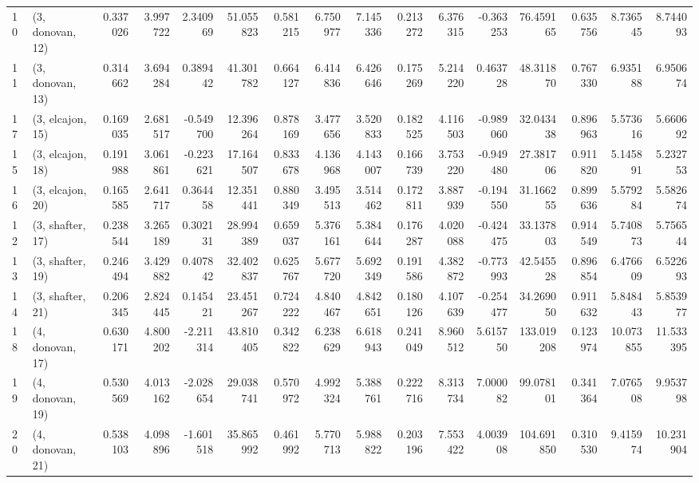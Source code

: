 \begin{tabular}{llrrrrrrrrrrrrrr}
10 &  (3, donovan, 12) &   0.337026 &  3.997722 &  2.340969 &  51.055823 &  0.581215 &   6.750977 &  7.145336 &  0.213272 &   6.376315 & -0.363253 &   76.459165 &  0.635756 &   8.736545 &   8.744093 \\
11 &  (3, donovan, 13) &   0.314662 &  3.694284 &  0.389442 &  41.301782 &  0.664127 &   6.414836 &  6.426646 &  0.175269 &   5.214220 &  0.463728 &   48.311870 &  0.767330 &   6.935188 &   6.950674 \\
17 &  (3, elcajon, 15) &   0.169035 &  2.681517 & -0.549700 &  12.396264 &  0.878169 &   3.477656 &  3.520833 &  0.182525 &   4.116503 & -0.989060 &   32.043438 &  0.896963 &   5.573616 &   5.660692 \\
15 &  (3, elcajon, 18) &   0.191988 &  3.061861 & -0.223621 &  17.164507 &  0.833678 &   4.136968 &  4.143007 &  0.166739 &   3.753220 & -0.949480 &   27.381706 &  0.911820 &   5.145891 &   5.232753 \\
16 &  (3, elcajon, 20) &   0.165585 &  2.641717 &  0.364458 &  12.351441 &  0.880349 &   3.495513 &  3.514462 &  0.172811 &   3.887939 & -0.194550 &   31.166255 &  0.899636 &   5.579284 &   5.582674 \\
12 &  (3, shafter, 17) &   0.238544 &  3.265189 &  0.302131 &  28.994389 &  0.659037 &   5.376161 &  5.384644 &  0.176287 &   4.020088 & -0.424475 &   33.137803 &  0.914549 &   5.740873 &   5.756544 \\
13 &  (3, shafter, 19) &   0.246494 &  3.429882 &  0.407842 &  32.402837 &  0.625767 &   5.677720 &  5.692349 &  0.191586 &   4.382872 & -0.773993 &   42.545528 &  0.896854 &   6.476609 &   6.522693 \\
14 &  (3, shafter, 21) &   0.206345 &  2.824445 &  0.145421 &  23.451267 &  0.724222 &   4.840467 &  4.842651 &  0.180126 &   4.107639 & -0.254477 &   34.269050 &  0.911632 &   5.848443 &   5.853977 \\
18 &  (4, donovan, 17) &   0.630171 &  4.800202 & -2.211314 &  43.810405 &  0.342822 &   6.238629 &  6.618943 &  0.241049 &   8.960512 &  5.615750 &  133.019208 &  0.123974 &  10.073855 &  11.533395 \\
19 &  (4, donovan, 19) &   0.530569 &  4.013162 & -2.028654 &  29.038741 &  0.570972 &   4.992324 &  5.388761 &  0.222716 &   8.313734 &  7.000082 &   99.078101 &  0.341364 &   7.076508 &   9.953798 \\
20 &  (4, donovan, 21) &   0.538103 &  4.098896 & -1.601518 &  35.865992 &  0.461992 &   5.770713 &  5.988822 &  0.203196 &   7.553422 &  4.003908 &  104.691850 &  0.310530 &   9.415974 &  10.231904 \\

\end{tabular}
